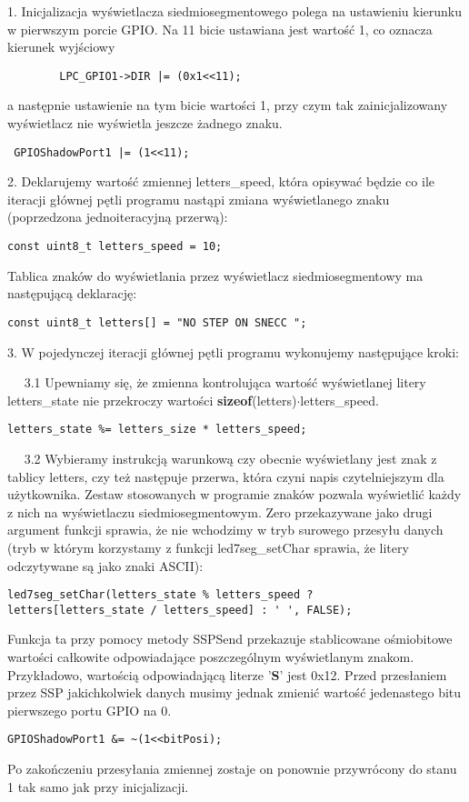 \documentclass[a4paper,12pt,twoside]{article}
\theoremstyle{plain}
\theoremstyle{definition}
\theoremstyle{remark}
\begin{document}
1. Inicjalizacja wyświetlacza siedmiosegmentowego polega na ustawieniu kierunku w pierwszym porcie GPIO. Na 11 bicie ustawiana jest wartość 1, co oznacza kierunek wyjściowy
\begin{verbatim}
		LPC_GPIO1->DIR |= (0x1<<11);
\end{verbatim}
a następnie ustawienie na tym bicie wartości 1, przy czym tak zainicjalizowany wyświetlacz nie wyświetla jeszcze żadnego znaku.
\begin{verbatim}
 GPIOShadowPort1 |= (1<<11);
\end{verbatim}

2. Deklarujemy wartość zmiennej letters\_speed, która opisywać będzie co ile iteracji głównej pętli programu nastąpi zmiana wyświetlanego znaku (poprzedzona jednoiteracyjną przerwą):
\begin{verbatim}
const uint8_t letters_speed = 10;
\end{verbatim}
Tablica znaków do wyświetlania przez wyświetlacz siedmiosegmentowy ma następującą deklarację:
\begin{verbatim}
const uint8_t letters[] = "NO STEP ON SNECC ";
\end{verbatim}

3. W pojedynczej iteracji głównej pętli programu wykonujemy następujące kroki:

$\quad$ 3.1 Upewniamy się, że zmienna kontrolująca wartość wyświetlanej litery letters\_state nie przekroczy wartości \textbf{sizeof}(letters)$\cdot$letters\_speed.
\begin{verbatim}
letters_state %= letters_size * letters_speed;
\end{verbatim}

$\quad$ 3.2 Wybieramy instrukcją warunkową czy obecnie wyświetlany jest znak z tablicy letters, czy też następuje przerwa, która czyni napis czytelniejszym dla użytkownika. Zestaw stosowanych w programie znaków pozwala wyświetlić każdy z nich na wyświetlaczu siedmiosegmentowym. Zero przekazywane jako drugi argument funkcji sprawia, że nie wchodzimy w tryb surowego przesyłu danych (tryb w którym korzystamy z funkcji led7seg\_setChar sprawia, że litery odczytywane są jako znaki ASCII):
\begin{verbatim}
led7seg_setChar(letters_state % letters_speed ?
letters[letters_state / letters_speed] : ' ', FALSE);
\end{verbatim}
Funkcja ta przy pomocy metody SSPSend przekazuje stablicowane ośmiobitowe wartości całkowite odpowiadające poszczególnym wyświetlanym znakom. Przykładowo, wartością odpowiadającą literze '\textbf{S}' jest 0x12. Przed przesłaniem przez SSP jakichkolwiek danych musimy jednak zmienić wartość jedenastego bitu pierwszego portu GPIO na 0. 
\begin{verbatim}
GPIOShadowPort1 &= ~(1<<bitPosi);
\end{verbatim}
Po zakończeniu przesyłania zmiennej zostaje on ponownie przywrócony do stanu 1 tak samo jak przy inicjalizacji.
\end{document}

